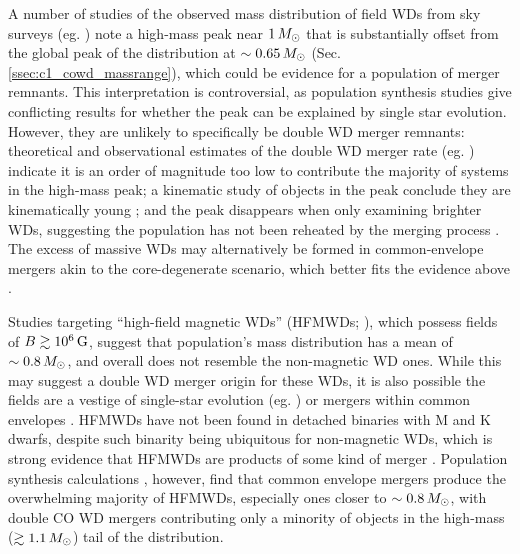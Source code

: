 
A number of studies of the observed mass distribution of field WDs from sky surveys (eg. \citealt{liebbh05, giambd12, klei+13, reba+15a, reba+15b}) note a high-mass peak near $1\,\Msun$ that is substantially offset from the global peak of the distribution at $\sim0.65\,\Msun$ (Sec. \ref{ssec:c1_cowd_massrange}), which could be evidence for a population of merger remnants.  This interpretation is controversial, as population synthesis studies \citep{reba+15a, trem+16} give conflicting results for whether the peak can be explained by single star evolution.  However, they are unlikely to specifically be double WD merger remnants: theoretical and observational estimates of the double WD merger rate (eg. \citealt{badem12, toonnp12}) indicate it is an order of magnitude too low \citep{trem+16} to contribute the majority of systems in the high-mass peak; a kinematic study of objects in the peak conclude they are kinematically young \citep{weggp12}; and the peak disappears when only examining brighter WDs, suggesting the population has not been reheated by the merging process \citep{reba+15b}.  The excess of massive WDs may alternatively be formed in common-envelope mergers akin to the core-degenerate scenario, which better fits the evidence above \citep{reba+15b, brig+15}.


Studies targeting ``high-field magnetic WDs'' (HFMWDs; \citealt{kepl+13, garc+16}), which possess fields of $B \gtrsim10^6\,\mathrm{G}$, suggest that population's mass distribution has a mean of $\sim0.8\,\Msun$, and overall does not resemble the non-magnetic WD ones.  While this may suggest a double WD merger origin for these WDs, it is also possible the fields are a vestige of single-star evolution (eg. \citealt{wickf05, kisst15}) or mergers within common envelopes \citep{garc+12, wicktf14, brig+15}.  HFMWDs have not been found in detached binaries with M and K dwarfs, despite such binarity being ubiquitous for non-magnetic WDs, which is strong evidence that HFMWDs are products of some kind of merger \citep{lieb+15, ferrdg15}.  Population synthesis calculations \citep{garc+12, brig+15}, however, find that common envelope mergers produce the overwhelming majority of HFMWDs, especially ones closer to $\sim0.8\,\Msun$, with double CO WD mergers contributing only a minority of objects in the high-mass ($\gtrsim1.1\,\Msun$) tail of the distribution.

